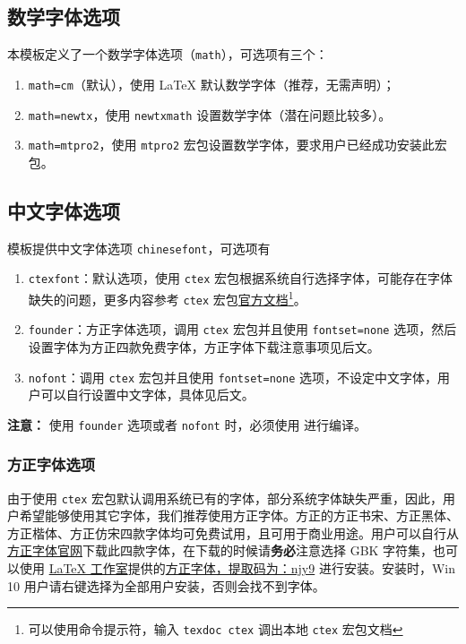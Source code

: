 \documentclass[cn,hazy,blue,14pt,screen]{elegantnote}
\begin{document}
\subsection{数学字体选项}

本模板定义了一个数学字体选项（\lstinline{math}），可选项有三个：
\begin{enumerate}
    \item \lstinline{math=cm}（默认），使用 \LaTeX{} 默认数学字体（推荐，无需声明）；
    \item \lstinline{math=newtx}，使用 \lstinline{newtxmath} 设置数学字体（潜在问题比较多）。
    \item \lstinline{math=mtpro2}，使用 \lstinline{mtpro2} 宏包设置数学字体，要求用户已经成功安装此宏包。
\end{enumerate}


\subsection{中文字体选项}
模板提供中文字体选项 \lstinline{chinesefont}，可选项有
\begin{enumerate}
    \item \lstinline{ctexfont}：默认选项，使用 \lstinline{ctex} 宏包根据系统自行选择字体，可能存在字体缺失的问题，更多内容参考 \lstinline{ctex} 宏包\href{https://ctan.org/pkg/ctex}{官方文档}\footnote{可以使用命令提示符，输入 \lstinline{texdoc ctex} 调出本地 \lstinline{ctex} 宏包文档}。
    \item \lstinline{founder}：方正字体选项，调用 \lstinline{ctex} 宏包并且使用 \lstinline{fontset=none} 选项，然后设置字体为方正四款免费字体，方正字体下载注意事项见后文。
    \item \lstinline{nofont}：调用 \lstinline{ctex} 宏包并且使用 \lstinline{fontset=none} 选项，不设定中文字体，用户可以自行设置中文字体，具体见后文。
\end{enumerate}

\noindent \textbf{注意：} 使用 \lstinline{founder} 选项或者 \lstinline{nofont} 时，必须使用  进行编译。

\subsubsection{方正字体选项}
由于使用 \lstinline{ctex} 宏包默认调用系统已有的字体，部分系统字体缺失严重，因此，用户希望能够使用其它字体，我们推荐使用方正字体。方正的{\songti 方正书宋}、{\heiti 方正黑体}、{\kaishu 方正楷体}、{\fangsong 方正仿宋}四款字体均可免费试用，且可用于商业用途。用户可以自行从\href{http://www.foundertype.com/}{方正字体官网}下载此四款字体，在下载的时候请\textbf{务必}注意选择 GBK 字符集，也可以使用 \href{https://www.latexstudio.net/}{\LaTeX{} 工作室}提供的\href{https://pan.baidu.com/s/1BgbQM7LoinY7m8yeP25Y7Q}{方正字体，提取码为：njy9} 进行安装。安装时，{\kaishu Win 10 用户请右键选择为全部用户安装，否则会找不到字体。}
\end{document}
